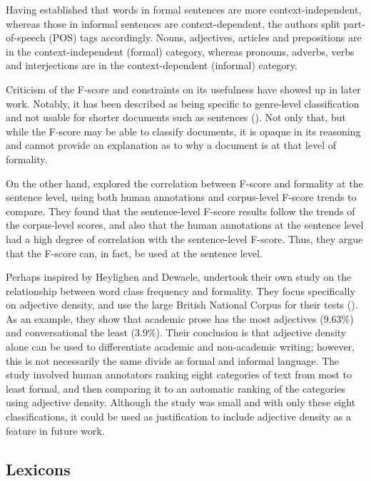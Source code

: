 Having established that words in formal sentences are more context-independent, whereas those in informal sentences are context-dependent, the authors split part-of-speech (POS) tags accordingly. Nouns, adjectives, articles and prepositions are in the context-independent (formal) category, whereas pronouns, adverbs, verbs and interjections are in the context-dependent (informal) category.

Criticism of the F-score and constraints on its usefulness have showed up in later work. Notably, it has been described as being specific to genre-level classification and not usable for shorter documents such as sentences (\cite{pavlick2016empirical}). Not only that, but while the F-score may be able to classify documents, it is opaque in its reasoning and cannot provide an explanation as to why a document is at that level of formality.

On the other hand, \cite{lahiri2011informality} explored the correlation between F-score and formality at the sentence level, using both human annotations and corpus-level F-score trends to compare. They found that the sentence-level F-score results follow the trends of the corpus-level scores, and also that the human annotations at the sentence level had a high degree of correlation with the sentence-level F-score. Thus, they argue that the F-score can, in fact, be used at the sentence level.

Perhaps inspired by Heylighen and Dewaele, \cite{fang2009adjective} undertook their own study on the relationship between word class frequency and formality. They focus specifically on adjective density, and use the large British National Corpus for their tests (\cite{bnc}). As an example, they show that academic prose has the most adjectives (9.63\%) and conversational the least (3.9\%). Their conclusion is that adjective density alone can be used to differentiate academic and non-academic writing; however, this is not necessarily the same divide as formal and informal language. The study involved human annotators ranking eight categories of text from most to least formal, and then comparing it to an automatic ranking of the categories using adjective density. Although the study was small and with only these eight classifications, it could be used as justification to include adjective density as a feature in future work.

\subsection{Lexicons}

